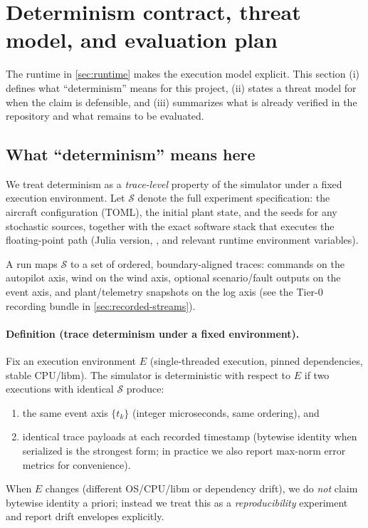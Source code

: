 \section{Determinism contract, threat model, and evaluation plan}
\label{sec:determinism}

The runtime in \cref{sec:runtime} makes the execution model explicit. This section (i) defines what ``determinism'' means for this project, (ii) states a threat model for when the claim is defensible, and (iii) summarizes what is already verified in the repository and what remains to be evaluated.

\subsection{What ``determinism'' means here}
\label{sec:determinism-definition}

We treat determinism as a \emph{trace-level} property of the simulator under a fixed execution environment. Let
\(\mathcal{S}\) denote the full experiment specification: the aircraft configuration (TOML), the initial plant state, and the seeds for any stochastic sources, together with the exact software stack that executes the floating-point path (Julia version, , and relevant runtime environment variables).

A run maps \(\mathcal{S}\) to a set of ordered, boundary-aligned traces: commands on the autopilot axis, wind on the wind axis, optional scenario/fault outputs on the event axis, and plant/telemetry snapshots on the log axis (see the Tier-0 recording bundle in \cref{sec:recorded-streams}).

\paragraph{Definition (trace determinism under a fixed environment).}
Fix an execution environment \(E\) (single-threaded execution, pinned dependencies, stable CPU/libm). The simulator is deterministic with respect to \(E\) if two executions with identical \(\mathcal{S}\) produce:
\begin{enumerate}[leftmargin=*]
  \item the same event axis \(\{t_k\}\) (integer microseconds, same ordering), and
  \item identical trace payloads at each recorded timestamp (bytewise identity when serialized is the strongest form; in practice we also report max-norm error metrics for convenience).
\end{enumerate}
When \(E\) changes (different OS/CPU/libm or dependency drift), we do \emph{not} claim bytewise identity a priori; instead we treat this as a \emph{reproducibility} experiment and report drift envelopes explicitly.

